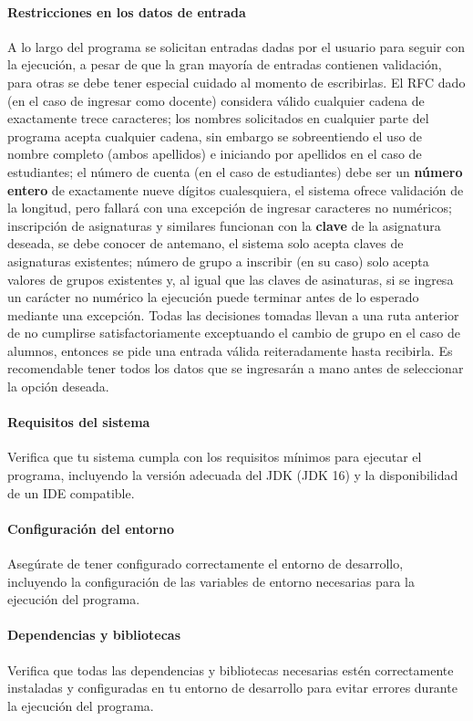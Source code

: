 \documentclass[a4paper,12pt]{article}
\begin{document}
\paragraph{Restricciones en los datos de entrada}
A lo largo del programa se solicitan entradas dadas por el usuario para seguir con la ejecución, a pesar de que la gran mayoría de entradas contienen validación, para otras se debe tener especial cuidado al momento de escribirlas. El RFC dado (en el caso de ingresar como docente) considera válido cualquier cadena de exactamente trece caracteres; los nombres solicitados en cualquier parte del programa acepta cualquier cadena, sin embargo se sobreentiendo el uso de nombre completo (ambos apellidos) e iniciando por apellidos en el caso de estudiantes; el número de cuenta (en el caso de estudiantes) debe ser un \textbf{número entero} de exactamente nueve dígitos cualesquiera, el sistema ofrece validación de la longitud, pero fallará con una excepción de ingresar caracteres no numéricos; inscripción de asignaturas y similares funcionan con la \textbf{clave} de la asignatura deseada, se debe conocer de antemano, el sistema solo acepta claves de asignaturas existentes; número de grupo a inscribir (en su caso) solo acepta valores de grupos existentes y, al igual que las claves de asinaturas, si se ingresa un carácter no numérico la ejecución puede terminar antes de lo esperado mediante una excepción. Todas las decisiones tomadas llevan a una ruta anterior de no cumplirse satisfactoriamente exceptuando el cambio de grupo en el caso de alumnos, entonces se pide una entrada válida reiteradamente hasta recibirla. Es recomendable tener todos los datos que se ingresarán a mano antes de seleccionar la opción deseada.

\paragraph{Requisitos del sistema}
Verifica que tu sistema cumpla con los requisitos mínimos para ejecutar el programa, incluyendo la versión adecuada del JDK (JDK 16) y la disponibilidad de un IDE compatible.

\paragraph{Configuración del entorno}
Asegúrate de tener configurado correctamente el entorno de desarrollo, incluyendo la configuración de las variables de entorno necesarias para la ejecución del programa.

\paragraph{Dependencias y bibliotecas}
Verifica que todas las dependencias y bibliotecas necesarias estén correctamente instaladas y configuradas en tu entorno de desarrollo para evitar errores durante la ejecución del programa.
\end{document}
